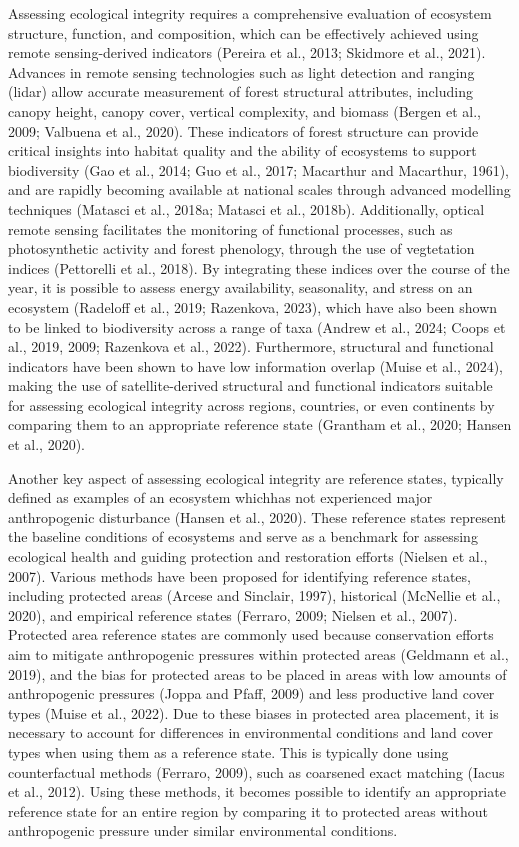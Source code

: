 \documentclass[
]{agujournal2019}
\begin{document}
Assessing ecological integrity requires a comprehensive evaluation of
ecosystem structure, function, and composition, which can be effectively
achieved using remote sensing-derived indicators (Pereira et al., 2013;
Skidmore et al., 2021). Advances in remote sensing technologies such as
light detection and ranging (lidar) allow accurate measurement of forest
structural attributes, including canopy height, canopy cover, vertical
complexity, and biomass (Bergen et al., 2009; Valbuena et al., 2020).
These indicators of forest structure can provide critical insights into
habitat quality and the ability of ecosystems to support biodiversity
(Gao et al., 2014; Guo et al., 2017; Macarthur and Macarthur, 1961), and
are rapidly becoming available at national scales through advanced
modelling techniques (Matasci et al., 2018a; Matasci et al., 2018b).
Additionally, optical remote sensing facilitates the monitoring of
functional processes, such as photosynthetic activity and forest
phenology, through the use of vegtetation indices (Pettorelli et al.,
2018). By integrating these indices over the course of the year, it is
possible to assess energy availability, seasonality, and stress on an
ecosystem (Radeloff et al., 2019; Razenkova, 2023), which have also been
shown to be linked to biodiversity across a range of taxa (Andrew et
al., 2024; Coops et al., 2019, 2009; Razenkova et al., 2022).
Furthermore, structural and functional indicators have been shown to
have low information overlap (Muise et al., 2024), making the use of
satellite-derived structural and functional indicators suitable for
assessing ecological integrity across regions, countries, or even
continents by comparing them to an appropriate reference state (Grantham
et al., 2020; Hansen et al., 2020).

Another key aspect of assessing ecological integrity are reference
states, typically defined as examples of an ecosystem whichhas not
experienced major anthropogenic disturbance (Hansen et al., 2020). These
reference states represent the baseline conditions of ecosystems and
serve as a benchmark for assessing ecological health and guiding
protection and restoration efforts (Nielsen et al., 2007). Various
methods have been proposed for identifying reference states, including
protected areas (Arcese and Sinclair, 1997), historical (McNellie et
al., 2020), and empirical reference states (Ferraro, 2009; Nielsen et
al., 2007). Protected area reference states are commonly used because
conservation efforts aim to mitigate anthropogenic pressures within
protected areas (Geldmann et al., 2019), and the bias for protected
areas to be placed in areas with low amounts of anthropogenic pressures
(Joppa and Pfaff, 2009) and less productive land cover types (Muise et
al., 2022). Due to these biases in protected area placement, it is
necessary to account for differences in environmental conditions and
land cover types when using them as a reference state. This is typically
done using counterfactual methods (Ferraro, 2009), such as coarsened
exact matching (Iacus et al., 2012). Using these methods, it becomes
possible to identify an appropriate reference state for an entire region
by comparing it to protected areas without anthropogenic pressure under
similar environmental conditions.
\end{document}
